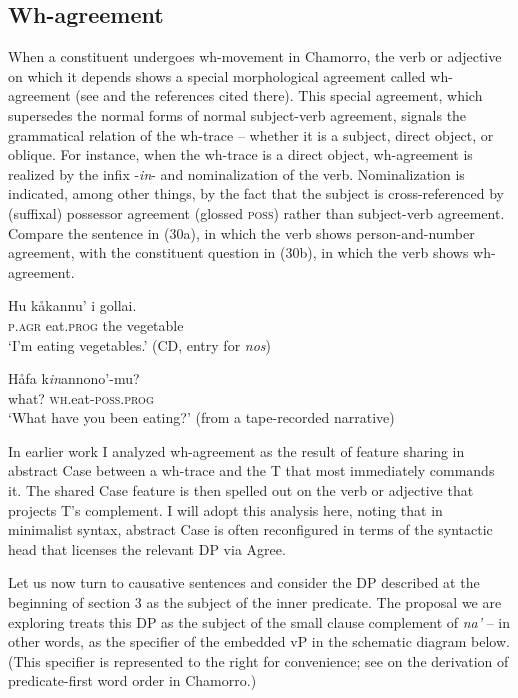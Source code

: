 \documentclass[output=paper,
modfonts
]{LSP/langsci}
\begin{document}
\begin{exe}
\begin{xlist}
\subsection{Wh-agreement}

When a constituent undergoes wh-movement in Chamorro, the verb or
adjective on which it depends shows a special morphological agreement
called wh-agreement (see \citealt{chung1998} and the references cited there).
This special agreement, which supersedes the normal forms of normal
subject-verb agreement, signals the grammatical relation of the
wh-trace -- whether it is a subject, direct object, or oblique. For
instance, when the wh-trace is a direct object, wh-agreement is realized
by the infix -\emph{in}- and nominalization of the verb. Nominalization
is indicated, among other things, by the fact that the subject is
cross-referenced by (suffixal) possessor agreement (glossed
\textsc{poss}) rather than subject-verb agreement. Compare the sentence
in (30a), in which the verb shows person-and-number agreement, with the
constituent question in (30b), in which the verb shows wh-agreement.

\ea
\ea
\gll  Hu kåkannu' i gollai.\\
\textsc{p.agr} eat\textsc{.prog} the vegetable\\
\glt `I'm eating vegetables.' (CD, entry for \emph{nos})

\ex \gll Håfa k\emph{in}annono'-mu?\\
what? \textsc{wh.}eat-\textsc{poss.prog}\\
\glt `What have you been eating?' (from a tape-recorded narrative)
\z
\z

In earlier work I analyzed wh-agreement as the result of feature sharing
in abstract Case between a wh-trace and the T that most immediately
commands it. The shared Case feature is then spelled out on the verb or
adjective that projects T's complement. I will adopt this analysis here,
noting that in minimalist syntax, abstract Case is often reconfigured in
terms of the syntactic head that licenses the relevant DP via Agree.

Let us now turn to causative sentences and consider the DP described at
the beginning of section 3 as the subject of the inner predicate. The
proposal we are exploring treats this DP as the subject of the small
clause complement of \emph{na'} -- in other words, as the specifier of
the embedded vP in the schematic diagram below. (This specifier is
represented to the right for convenience; see \citealt{chung1998} on the
derivation of predicate-first word order in Chamorro.)


\end{xlist}
\end{exe}
\end{document}
